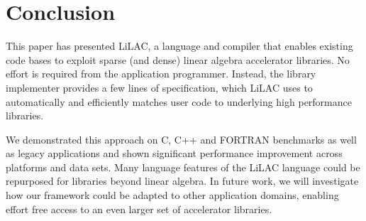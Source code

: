 \section{Conclusion}
\label{sec:conclusion}



This paper has presented LiLAC, a language and compiler that enables existing
code bases to exploit sparse (and dense) linear algebra accelerator libraries.
No effort is required from the application programmer.
Instead, the library implementer provides a few lines of specification, which
LiLAC uses to  automatically and efficiently matches  user code to
underlying high performance libraries.

We demonstrated this approach on  C, C++ and FORTRAN benchmarks as well as
legacy applications and shown significant performance improvement across
platforms and data sets.
Many language features of the LiLAC language could be repurposed for libraries
beyond linear algebra.
In future work, we will investigate how our framework could be adapted to other
application domains, enabling effort free access to an even larger set of
accelerator libraries.

